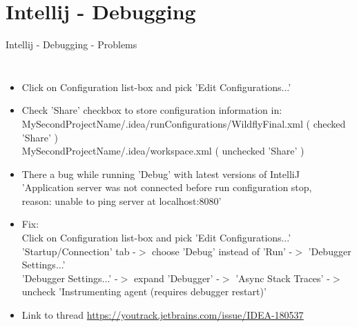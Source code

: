 \documentclass[aspectratio=1610,english]{beamer} %
\begin{document}
	\section{Intellij - Debugging}
	\begin{frame}{Intellij - Debugging - Problems}
		\begin{columns}
				\begin{itemize}
					\tiny
					\color{black}
					\item Click on Configuration list-box and pick 'Edit Configurations...' 
					\item Check 'Share' checkbox to store configuration information in:
						\color{gray}
						\fontsize{4}{5} \selectfont 
						MySecondProjectName/.idea/runConfigurations/Wildfly\textunderscore Final.xml ( checked 'Share' ) \\
						MySecondProjectName/.idea/workspace.xml ( unchecked 'Share' )
						\usebox\configurationBox 
					\tiny
					\color{black}
					\item There a bug while running 'Debug' with latest versions of IntelliJ
						\color{red}
						'Application server was not connected before run configuration stop, \\ 
						reason: unable to ping server at localhost:8080'
					\color{black}
					\item Fix: \\
					\color{myGreen}
						Click on Configuration list-box and pick 'Edit Configurations...' \\
						'Startup/Connection' tab -$>$ choose 'Debug' instead of 'Run' -$>$ 'Debugger Settings...' \\
						'Debugger Settings...' -$>$ expand 'Debugger' -$>$ 'Async Stack Traces' -$>$ uncheck 'Instrumenting agent (requires debugger restart)' 
					\color{black}
					\item Link to thread
					\color{gray}
					\url{https://youtrack.jetbrains.com/issue/IDEA-180537}
				\end{itemize}
				
			

\end{columns}
\end{frame}
\end{document}
